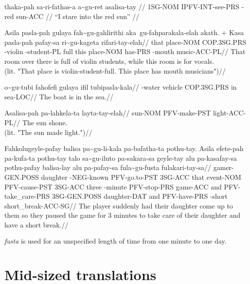 \ex
\begingl
\gla thaka-pah sa-ri-fathas-a   a\~{}gu-ret   asalisa-tay //
\glb 1SG-NOM   IPFV-INT-see-PRS \agradj{}-red sun-ACC //
\glft ``I stare into the red sun'' //
\endgl
\xe

\ex
\begingl
\gla Asila pasla-pah gulaya      fah\~{}gu-gahlirithi aka~gu-fahparakala-elah akath.
+ Kasa pasla-pah pafay-sa ri\~{}gu-kageta  rifari-tay-elah//
\glb that  place-NOM COP.3SG.PRS \agradj{}-violin    \agradj{}-student-PL      full   this place-NOM has-PRS  \agradj{}-mouth music-ACC-PL//
\glft That room over there is full of violin students, while this room is for vocals. \\
     (lit. "That place is violin-student-full. This place has mouth musicians")//
\endgl
\xe

\ex
\begingl
\gla  o\~{}gu-tubi    fahofefi gulaya      ifil tubipasla-kala//
\glb  \agradj{}-water vehicle  COP.3SG.PRS in   sea-LOC//
\glft The boat is in the sea.//
\endgl
\xe

\ex
\begingl
\gla  Asalisa-pah pa-lahkela-ta layta-tay-elah//
\glb  sun-NOM     PFV-make-PST  light-ACC-PL//
\glft The sun shone. \\
      (lit. "The sun made light.")//
\endgl
\xe

\ex
\begingl 
\gla  Fahkolugeyle-pafay balisa   pa\~{}gu-li-kala     pa-bafatha-ta pothu-tay. Asila efete-pah pa-kufa-ta    pothu-tay talo  sa\~{}gu-iluto   pa-sakara-sa geyle-tay alu pa-kasafay-sa      pothu-pafay  balisa-lay   alu pa-pafay-sa  fula\~{}gu-fusta              fulakari-tay-sa//
\glb  gamer-GEN.POSS     daughter \agradj{}-NEG-known  PFV-go.to-PST 3SG-ACC    that  event-NOM PFV-cause-PST 3SG-ACC   three \agradj{}-minute PFV-stop-PRS game-ACC  and PFV-take\_care-PRS 3SG-GEN.POSS daughter-DAT and PFV-have-PRS \agradj{}-short short\_break-ACC-SG//
\glft The player suddenly had their daughter come up to them so they paused the game for 3 minutes to take care of their daughter and have a short break.//
\endgl
\xe

\textit{fusta} is used for an unspecified length of time from one minute to one day.



\chapter{Mid-sized translations}

\newpage

\newpage


\newpage
